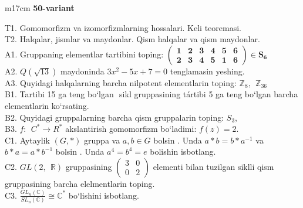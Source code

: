 \documentclass{article}
\begin{document}
\begin{tabular}{m{17cm}}
\textbf{50-variant}
\newline

T1. Gomomorfizm va izomorfizmlarning hossalari. Keli teoremasi. \\
T2. Halqalar, jismlar va maydonlar. Qism halqalar va qism maydonlar. \\
A1. Gruppaning elementlar tartibini toping: \(\begin{pmatrix}
\mathbf{1} & \mathbf{2} & \mathbf{3} & \mathbf{4} & \mathbf{5} & \mathbf{6} \\
\mathbf{2} & \mathbf{3} & \mathbf{4} & \mathbf{5} & \mathbf{1} & \mathbf{6}
\end{pmatrix}\mathbf{\in}\mathbf{S}_{\mathbf{6}}\) \\
A2. \(Q(\sqrt{13})\) maydoninda \(3x^{2} - 5x + 7 = 0\) tenglamasin yeshing. \\
A3. Quyidagi halqalarning barcha nilpotent elementlarin toping: \(\mathbb{Z}_{8},\ \ \mathbb{Z}_{36}\) \\
B1. Tartibi 15 ga teng bo`lgan \(< a >\) sikl gruppasining tártibi 5 ga teng bo`lgan barcha elementlarin ko`rsating. \\
B2. Quyidagi gruppalarning barcha qism gruppalarin toping: \(S_{3},\) \\
B3. \(f:\ \ C^{*} \rightarrow R^{*}\) akslantirish gomomorfizm bo`ladimi: \(f(z) = 2.\) \\
C1. Aytaylik \((G,*)\) gruppa va \(a,b \in G\) bo\textquotesingle lsin . Unda \(a*b = b*a^{- 1}\) va \(b*a = a*b^{- 1}\) bo\textquotesingle lsin . Unda \(a^{4} = b^{4} = e\) bolishin isbotlang. \\
C2. \(GL(2,\mathbb{\ \ R})\) gruppasining \(\begin{pmatrix}
3 & 0 \\
0 & 2
\end{pmatrix}\) elementi bilan tuzilgan siklli qism gruppasining barcha elelmentlarin toping. \\
C3. \(\frac{GL_{n}(\mathbb{C})}{SL_{n}(\mathbb{C})} \cong \mathbb{C}^{*}\) bo`lishini isbotlang.
 \\

\end{tabular}
\vspace{1cm}
\end{document}
